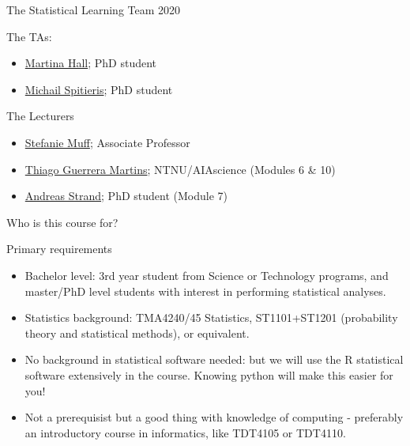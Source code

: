 \documentclass[10pt,ignorenonframetext,]{beamer}
\providecommand{\tightlist}{%
  \setlength{\itemsep}{0pt}\setlength{\parskip}{0pt}}
\begin{document}
\begin{frame}{The Statistical Learning Team 2020}

\begin{block}{The TAs:}

\begin{itemize}
\tightlist
\item
  \href{https://www.ntnu.no/ansatte/martina.hall}{Martina Hall}; PhD
  student
\item
  \href{https://www.ntnu.no/ansatte/michail.spitieris}{Michail
  Spitieris}; PhD student
\end{itemize}

\end{block}

\begin{block}{The Lecturers}

\begin{itemize}
\tightlist
\item
  \href{https://www.ntnu.edu/employees/stefanie.muff}{Stefanie Muff};
  Associate Professor
\item
  \href{https://www.ntnu.no/ansatte/thiago.guerrera}{Thiago Guerrera
  Martins}; NTNU/AIAscience (Modules 6 \& 10)
\item
  \href{https://www.ntnu.no/ansatte/andreas.strand}{Andreas Strand}; PhD
  student (Module 7)
\end{itemize}

\end{block}

\end{frame}

\begin{frame}{Who is this course for?}

\begin{block}{Primary requirements}

\begin{itemize}
\item
  Bachelor level: 3rd year student from Science or Technology programs,
  and master/PhD level students with interest in performing statistical
  analyses.
\item
  Statistics background: TMA4240/45 Statistics, ST1101+ST1201
  (probability theory and statistical methods), or equivalent.
\item
  No background in statistical software needed: but we will use the R
  statistical software extensively in the course. Knowing python will
  make this easier for you!
\item
  Not a prerequisist but a good thing with knowledge of computing -
  preferably an introductory course in informatics, like TDT4105 or
  TDT4110.
\end{itemize}

\end{block}

\end{frame}
\end{document}
